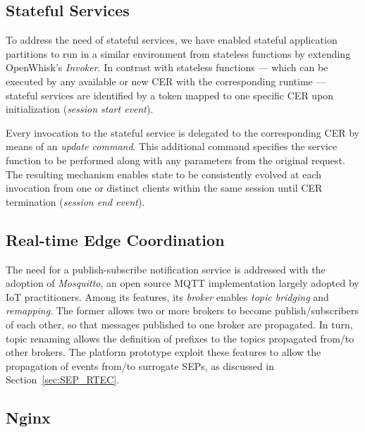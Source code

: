 \subsection{Stateful Services}

To address the need of stateful services, we have enabled stateful application partitions to run in a similar environment from stateless functions by extending OpenWhisk's \textit{Invoker}. In contrast with stateless functions --- which can be executed by any available or new CER with the corresponding runtime --- stateful services are identified by a token mapped to one specific CER upon initialization (\textit{session start event}). 

Every invocation to the stateful service is delegated to the corresponding CER by means of an \textit{update command}. This additional command specifies the service function to be performed along with any parameters from the original request. The resulting mechanism enables state to be consistently evolved at each invocation from one or distinct clients within the same session until CER termination (\textit{session end event}).


\subsection{Real-time Edge Coordination}


The need for a publish-subscribe notification service is addressed with the adoption of \textit{Mosquitto}, an open source MQTT implementation largely adopted by IoT practitioners. %
Among its features, its \textit{broker} enables \textit{topic bridging} and \textit{remapping}. The former allows two or more brokers to become publish/subscribers of each other, so that messages published to one broker are propagated. In turn, topic renaming allows the definition of prefixes to the topics propagated from/to other brokers. The platform prototype exploit these features to allow the propagation of events from/to surrogate SEPs, as discussed in Section~\ref{sec:SEP_RTEC}. %

\subsection{Nginx}\label{sec:prototype_Nginx}

